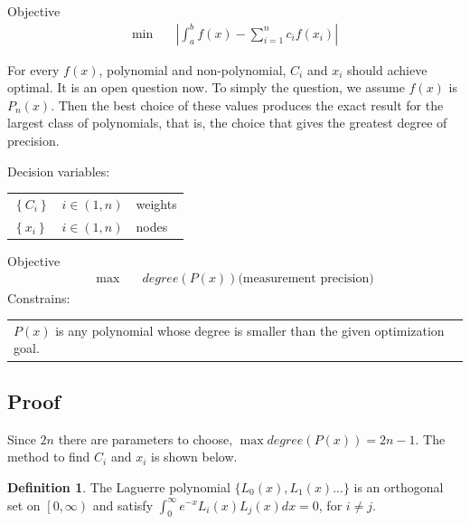 \documentclass[
10pt, %
a4paper, %
oneside, %
headinclude,footinclude, %
BCOR5mm, %
]{scrartcl}
\theoremstyle{definition}
\newtheorem{defn}[thm]{Definition}
\begin{document}
\setcounter{equation}{0}
\noindent Objective
\begin{align*}
\min \quad
& \left|\int_{a}^{b}f(x)-\sum\limits_{i=1}^{n}c_if(x_i)\right|
\end{align*}

For every $f(x)$, polynomial and non-polynomial, $C_i$ and $x_i$ should achieve optimal. It is an open question now. To simply the question, we assume $f(x)$ is $P_n(x)$. Then the best choice of these values produces the exact
result for the largest class of polynomials, that is, the choice that gives the greatest degree
of precision.



\noindent Decision variables:\\
\begin{tabular}{lll}
 \quad$\left\{C_i\right\}$ &$i\in\left(1,n\right)$ & weights\\
 \quad$\left\{x_i\right\}$ &$i\in\left(1,n\right)$ & nodes
\end{tabular}

\setcounter{equation}{0}
\noindent Objective
\begin{align*}
\max  \quad
& degree(P(x)) \text{(measurement precision)}
\end{align*}
Constrains:\\
\begin{tabular}{l}
 \quad $P(x)$ is any polynomial whose degree is smaller than the given optimization goal.
\end{tabular}

\subsection{Proof}
Since $2n$ there are parameters to choose, $\max degree(P(x))=2n-1$. The method to find $C_i$ and $x_i$ is shown below.

\begin{defn}
The Laguerre polynomial $\{L_0(x),L_1(x)... \}$ is an orthogonal set on $\left[0,\infty\right)$ and satisfy $\int_0^\infty{e^{-x}L_i(x)L_j(x)dx=0}$, for $i \neq j$.
\end{defn}
\end{document}
